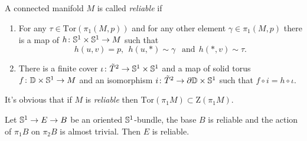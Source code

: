 \documentclass{amsart}
\begin{document}
\subsection{}


\begin{defn}
A connected manifold $M$ is called \emph{reliable} if 
\begin{enumerate}
\item \label{reliable1} For any 
$\tau\in \mathrm{Tor}(\pi_1(M,p))$ and for any other element $\gamma\in \pi_1(M,p)$ there is a map of $h\colon {\Bbb S}^1\times {\Bbb S}^1\to M$  such that 
$$h(u,v)= p,\ \ 
h(u,*)\sim\gamma\ \ \text{ and}\ \ 
h(*,v)\sim\tau.$$
\item \label{reliable2} There is a finite cover $\iota\colon \tilde T^2\z\to {\Bbb S}^1\times {\Bbb S}^1$ and a map of solid torus $f\colon \DD\times {\Bbb S}^1\z\to M$ and an isomorphism $i\colon \tilde T^2\to \partial \mathbb{D}\times {\Bbb S}^1$ such that $f\circ i=h\circ\iota$.
\end{enumerate}

\end{defn}

It's obvious that if $M$ is \emph{reliable} then  $\mathrm{Tor}(\pi_1M)\subset \mathrm{Z}(\pi_1M)$.
\begin{claim}
 Let ${\Bbb S}^1\to E\to B$ be an oriented ${\Bbb S}^1$-bundle, the base  $B$ is reliable and the action of $\pi_1B$ on $\pi_2B$ is almost trivial. 
Then $E$ is reliable.
\end{claim}
\end{document}
